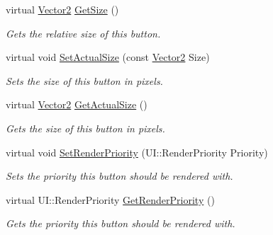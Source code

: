 \begin{DoxyCompactItemize}
virtual \hyperlink{classphys_1_1Vector2}{Vector2} \hyperlink{classphys_1_1UI_1_1Button_ade75e042d1a19be5d4fb1b16913af5a5}{GetSize} ()
\begin{DoxyCompactList}\small\item\em Gets the relative size of this button. \item\end{DoxyCompactList}\item 
virtual void \hyperlink{classphys_1_1UI_1_1Button_a7ac62ddb9f40a701e80a4eccacdc7ea0}{SetActualSize} (const \hyperlink{classphys_1_1Vector2}{Vector2} Size)
\begin{DoxyCompactList}\small\item\em Sets the size of this button in pixels. \item\end{DoxyCompactList}\item 
virtual \hyperlink{classphys_1_1Vector2}{Vector2} \hyperlink{classphys_1_1UI_1_1Button_ab6640af433afe96d5f6bd7016986d73f}{GetActualSize} ()
\begin{DoxyCompactList}\small\item\em Gets the size of this button in pixels. \item\end{DoxyCompactList}\item 
virtual void \hyperlink{classphys_1_1UI_1_1Button_a569053caa70448d560fd016d86ef52cb}{SetRenderPriority} (UI::RenderPriority Priority)
\begin{DoxyCompactList}\small\item\em Sets the priority this button should be rendered with. \item\end{DoxyCompactList}\item 
virtual UI::RenderPriority \hyperlink{classphys_1_1UI_1_1Button_aa17ffbc9b0d4eed151ff5ecbf93d88b8}{GetRenderPriority} ()
\begin{DoxyCompactList}\small\item\em Gets the priority this button should be rendered with. \item\end{DoxyCompactList}\end{DoxyCompactItemize}
